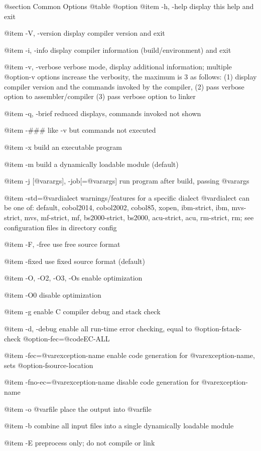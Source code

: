 @section Common Options
@table @option
@item -h, -help
display this help and exit

@item -V, -version
display compiler version and exit

@item -i, -info
display compiler information (build/environment)
and exit

@item -v, -verbose
verbose mode, display additional information;
multiple @option{-v} options increase the verbosity,
the maximum is 3 as follows:
(1) display compiler version and the commands
invoked by the compiler,
(2) pass verbose option to assembler/compiler
(3) pass verbose option to linker

@item -q, -brief
reduced displays, commands invoked not shown

@item -###
like -v but commands not executed

@item -x
build an executable program

@item -m
build a dynamically loadable module (default)

@item -j [@var{args}], -job[=@var{args}]
run program after build, passing @var{args}

@item -std=@var{dialect}
warnings/features for a specific dialect
@var{dialect} can be one of:
default, cobol2014, cobol2002, cobol85, xopen,
ibm-strict, ibm, mvs-strict, mvs,
mf-strict, mf, bs2000-strict, bs2000,
acu-strict, acu, rm-strict, rm;
see configuration files in directory config

@item -F, -free
use free source format

@item -fixed
use fixed source format (default)

@item -O, -O2, -O3, -Os
enable optimization

@item -O0
disable optimization

@item -g
enable C compiler debug and stack check

@item -d, -debug
enable all run-time error checking,
equal to @option{-fstack-check} @option{-fec=}@code{EC-ALL}

@item -fec=@var{exception-name}
enable code generation for @var{exception-name},
sets @option{-fsource-location}

@item -fno-ec=@var{exception-name}
disable code generation for @var{exception-name}

@item -o @var{file}
place the output into @var{file}

@item -b
combine all input files into a single
dynamically loadable module

@item -E
preprocess only; do not compile or link

